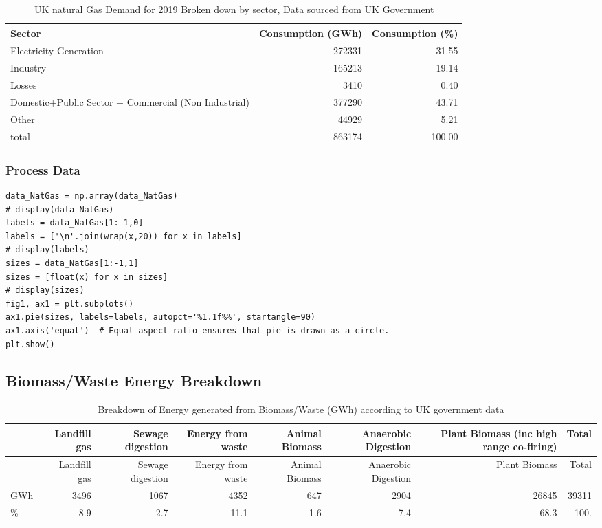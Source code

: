 \documentclass[11pt]{article}
\numberwithin{equation}{section}
\begin{document}
\begin{table}[H]
\caption{\label{tabNatGasDemandBreakdown}UK natural Gas Demand for 2019 Broken down by sector, Data sourced from UK Government \cite{NaturalGas}}
\centering
\begin{tabular}{lrr}
\toprule
Sector & Consumption (GWh) & Consumption (\%)\\
\midrule
Electricity Generation & 272331 & 31.55\\
Industry & 165213 & 19.14\\
Losses & 3410 & 0.40\\
Domestic+Public Sector + Commercial (Non Industrial) & 377290 & 43.71\\
Other & 44929 & 5.21\\
\midrule
total & 863174 & 100.00\\
\bottomrule
\end{tabular}
\end{table}

\subsubsection{Process Data}
\label{sec:orgf941c14}
\begin{verbatim}
data_NatGas = np.array(data_NatGas)
# display(data_NatGas)
labels = data_NatGas[1:-1,0]
labels = ['\n'.join(wrap(x,20)) for x in labels]
# display(labels)
sizes = data_NatGas[1:-1,1]
sizes = [float(x) for x in sizes]
# display(sizes)
fig1, ax1 = plt.subplots()
ax1.pie(sizes, labels=labels, autopct='%1.1f%%', startangle=90)
ax1.axis('equal')  # Equal aspect ratio ensures that pie is drawn as a circle.
plt.show()
\end{verbatim}

\subsection{Biomass/Waste Energy Breakdown \label{secAppBiomassWasteEner}}
\label{sec:orgbdc2c60}
\begin{table}[H]
\caption{\label{tabBiomassBreakdown}Breakdown of Energy generated from Biomass/Waste (GWh) according to UK government data \cite{RenewableElecricityCap}}
\centering
\tiny
\begin{tabular}{lrrrrrrr}
\toprule
 & Landfill gas & Sewage digestion & Energy from waste & Animal Biomass & Anaerobic Digestion & Plant Biomass (inc high range co-firing) & Total\\
\midrule
 & Landfill gas & Sewage digestion & Energy from waste & Animal Biomass & Anaerobic Digestion & Plant Biomass & Total\\
GWh & 3496 & 1067 & 4352 & 647 & 2904 & 26845 & 39311\\
\% & 8.9 & 2.7 & 11.1 & 1.6 & 7.4 & 68.3 & 100.\\
\bottomrule
\end{tabular}
\end{table}
\end{document}

